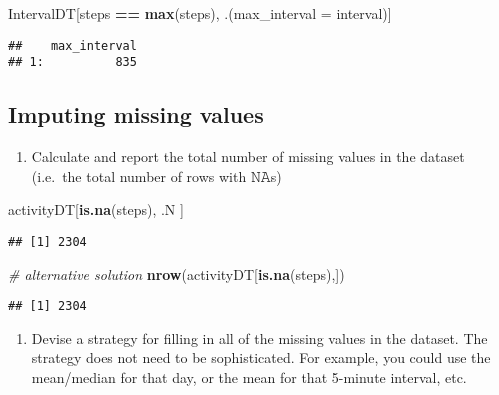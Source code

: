 \documentclass[
]{article}
\newenvironment{Shaded}{\begin{snugshade}}{\end{snugshade}}
\newcommand{\CommentTok}[1]{\textcolor[rgb]{0.56,0.35,0.01}{\textit{#1}}}
\newcommand{\DataTypeTok}[1]{\textcolor[rgb]{0.13,0.29,0.53}{#1}}
\newcommand{\KeywordTok}[1]{\textcolor[rgb]{0.13,0.29,0.53}{\textbf{#1}}}
\newcommand{\NormalTok}[1]{#1}
\newcommand{\OperatorTok}[1]{\textcolor[rgb]{0.81,0.36,0.00}{\textbf{#1}}}
\newcommand{\StringTok}[1]{\textcolor[rgb]{0.31,0.60,0.02}{#1}}
\providecommand{\tightlist}{%
  \setlength{\itemsep}{0pt}\setlength{\parskip}{0pt}}
\begin{document}
\begin{Shaded}
\begin{Highlighting}[]
\NormalTok{IntervalDT[steps }\OperatorTok{==}\StringTok{ }\KeywordTok{max}\NormalTok{(steps), .(}\DataTypeTok{max_interval =}\NormalTok{ interval)]}
\end{Highlighting}
\end{Shaded}

\begin{verbatim}
##    max_interval
## 1:          835
\end{verbatim}

\hypertarget{imputing-missing-values}{%
\subsection{Imputing missing values}\label{imputing-missing-values}}

\begin{enumerate}
\def\labelenumi{\arabic{enumi}.}
\tightlist
\item
  Calculate and report the total number of missing values in the dataset
  (i.e.~the total number of rows with 𝙽𝙰s)
\end{enumerate}

\begin{Shaded}
\begin{Highlighting}[]
\NormalTok{activityDT[}\KeywordTok{is.na}\NormalTok{(steps), .N ]}
\end{Highlighting}
\end{Shaded}

\begin{verbatim}
## [1] 2304
\end{verbatim}

\begin{Shaded}
\begin{Highlighting}[]
\CommentTok{# alternative solution}
\KeywordTok{nrow}\NormalTok{(activityDT[}\KeywordTok{is.na}\NormalTok{(steps),])}
\end{Highlighting}
\end{Shaded}

\begin{verbatim}
## [1] 2304
\end{verbatim}

\begin{enumerate}
\def\labelenumi{\arabic{enumi}.}
\setcounter{enumi}{1}
\tightlist
\item
  Devise a strategy for filling in all of the missing values in the
  dataset. The strategy does not need to be sophisticated. For example,
  you could use the mean/median for that day, or the mean for that
  5-minute interval, etc.
\end{enumerate}
\end{document}
